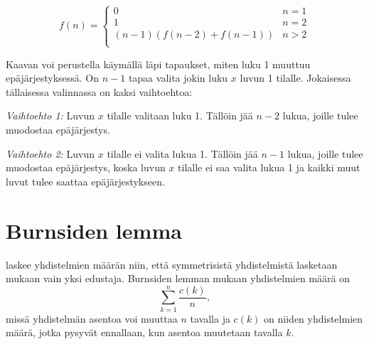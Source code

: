 \begin{equation*}
    f(n) = \begin{cases}
               0               & n = 1\\
               1               & n = 2\\
               (n-1)(f(n-2) + f(n-1)) & n>2 \\
           \end{cases}
\end{equation*}

Kaavan voi perustella käymällä läpi tapaukset,
miten luku 1 muuttuu epäjärjestyksessä.
On $n-1$ tapaa valita jokin luku $x$ luvun 1 tilalle.
Jokaisessa tällaisessa valinnassa on kaksi vaihtoehtoa:

\textit{Vaihtoehto 1:} Luvun $x$ tilalle valitaan luku 1.
Tällöin jää $n-2$ lukua, joille tulee muodostaa epäjärjestys.

\textit{Vaihtoehto 2:} Luvun $x$ tilalle ei valita lukua 1.
Tällöin jää $n-1$ lukua, joille tulee muodostaa epäjärjestys,
koska luvun $x$ tilalle ei saa valita lukua 1
ja kaikki muut luvut tulee saattaa epäjärjestykseen.

\section{Burnsiden lemma}


 laskee yhdistelmien määrän niin,
että symmetrisistä yhdistelmistä lasketaan
mukaan vain yksi edustaja.
Burnsiden lemman mukaan yhdistelmien määrä on
\[\sum_{k=1}^n \frac{c(k)}{n},\]
missä yhdistelmän asentoa voi muuttaa $n$ tavalla
ja $c(k)$ on niiden yhdistelmien määrä,
jotka pysyvät ennallaan, kun asentoa
muutetaan tavalla $k$.

